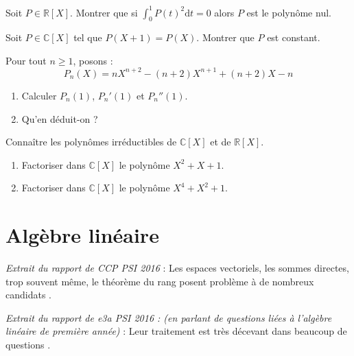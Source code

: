 \documentclass[a4paper,twoside,french,10pt]{VcCours}
\newcommand{\dt}{\text{d}t}
\begin{document}


\begin{Exercice}{}\end{Exercice} Soit $P \in \mathbb{R}[X]$. Montrer que si $\int_0^1 P(t)^2 \dt= 0$ alors $P$ est le polynôme nul.

\begin{Exercice}{}\end{Exercice} Soit $P \in \mathbb{C}[X]$ tel que $P(X+1)=P(X)$. Montrer que $P$ est constant.

\medskip

\begin{Exercice}{}\end{Exercice} Pour tout $n \geq 1$, posons :
$$ P_n(X) = n X^{n+2} - (n+2)X^{n+1} + (n+2)X -n $$
\begin{enumerate}
\item Calculer $P_n(1)$, $P_n'(1)$ et $P_n''(1)$.
\item Qu'en déduit-on ?
\end{enumerate}

\begin{ptc}{}
	Connaître les polynômes irréductibles de $\mathbb{C}[X]$ et de $\mathbb{R}[X]$.
\end{ptc}

\begin{Exercice}{}\end{Exercice} 

\begin{enumerate}
\item Factoriser dans $\mathbb{C}[X]$ le polynôme $X^2+X+1$.
\item Factoriser dans $\mathbb{C}[X]$ le polynôme $X^4+X^2+1$.
\end{enumerate}


\section{Algèbre linéaire}

\textit{Extrait du rapport de CCP PSI 2016} : \og Les espaces vectoriels, les sommes directes, trop souvent même, le théorème du rang posent problème à de nombreux candidats \fg .

\medskip

\textit{Extrait du rapport de e3a PSI 2016 : (en parlant de questions liées à l'algèbre linéaire de première \newline année) } : \og Leur traitement est très décevant dans beaucoup de questions \fg .
\end{document}

